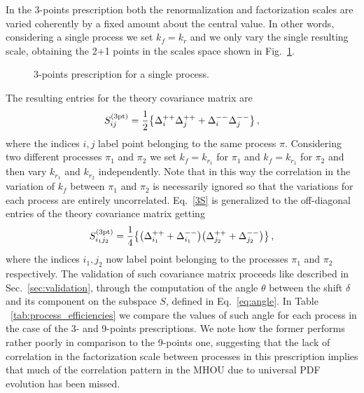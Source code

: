 %
In the 3-points prescription both the renormalization and factorization scales are varied coherently by a fixed amount about the
central value.
In other words, considering a single process we set $k_f=k_r$ and we only vary the single resulting scale, obtaining the
2+1 points in the scales space shown in Fig.~\ref{fig:3-points}.
\begin{figure}[t]
    \centering
    {}\qquad
    \begin{caption}{3-points prescription for a single process.}
      \label{fig:3-points}
    \end{caption}
\end{figure}
The resulting entries for the theory covariance matrix are 
\begin{align}
    \label{3S}
    S^{(\rm 3pt)}_{ij} = \frac{1}{2}\big\{ \Delta_i^{++}\Delta_j^{++}  + \Delta_i^{--}\Delta_j^{--}\big\} \, ,
\end{align}
where the indices $i,j$ label point belonging to the same process $\pi$.
Considering two different processes $\pi_1$ and $\pi_2$ we set $k_f=k_{r_1}$ for $\pi_1$ and $k_f=k_{r_1}$ for $\pi_2$
and then vary $k_{r_1}$ and $k_{r_2}$ independently. Note that in this way the correlation in the variation of $k_f$
between $\pi_1$ and $\pi_2$ is necessarily ignored so that the variations for each process are entirely uncorrelated.
Eq.~\eqref{3S} is generalized to the off-diagonal entries of the theory covariance matrix getting
\begin{equation}
    S^{(\rm 3pt)}_{i_1j_2} = 
    \frac{1}{4}\big\{\big(\Delta_{i_1}^{++} + \Delta_{i_1}^{--} \big) \big(\Delta_{j_2}^{++} + \Delta_{j_2}^{--} \big) \big\}\, ,
\end{equation}
where the indices $i_1,j_2$ now label point belonging to the processes $\pi_1$ and $\pi_2$ respectively.
The validation of such covariance matrix proceeds like described in Sec.~\ref{sec:validation},
through the computation of the angle $\theta$ between the shift $\delta$ and its component on the
subspace $S$, defined in Eq.~\eqref{eq:angle}. In Table ~\ref{tab:process_efficiencies} 
we compare the values of such angle for each process in the case of the 3- and 9-points prescriptions.
We note how the former performs rather poorly in comparison to the 9-points one,
suggesting that the lack of correlation in the factorization scale between processes in this prescription
implies that much of the correlation pattern in the MHOU due to universal PDF evolution has been missed.
\begin{table}[ht!]
	\centering
	\small
	
        \vspace{3mm}
	\caption{Comparison between the $\theta$ values for the 3- and 9-points prescriptions.}
	\label{tab:process_efficiencies}
\end{table}

